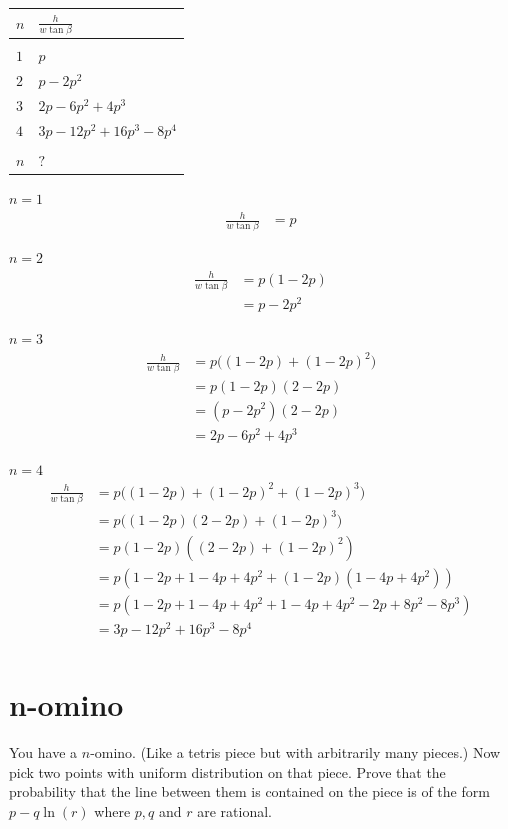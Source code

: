 \documentclass[12pt]{article}
\begin{document}
\newpage

\begin{tabular}{l|l}
  $n$&$\frac{h}{w\tan\beta}$\\
  \hline\\
  $1$& $p$\\
  $2$& $p - 2p^2$\\
  $3$& $2p - 6p^2 + 4p^3$\\
  $4$& $3p - 12p^2 + 16p^3 - 8p^4$\\ \\
  $n$& $?$
\end{tabular}


$n = 1$
\begin{align*}
  \frac{h}{w\tan\beta}
  &= p
\end{align*}

$n = 2$
\begin{align*}
  \frac{h}{w\tan\beta}
  &= p(1 - 2p)\\
        &= p - 2p^2
\end{align*}

$n = 3$
\begin{align*}
  \frac{h}{w\tan\beta}
  &= p\Big((1 - 2p) + (1 - 2p)^2\Big)\\
  &= p(1 - 2p)(2 - 2p)\\
  &= (p - 2p^2)(2 - 2p)\\
  &= 2p - 6p^2 + 4p^3
\end{align*}

$n = 4$
\begin{align*}
  \frac{h}{w\tan\beta}
  &= p\Big((1 - 2p) + (1 - 2p)^2 + (1 - 2p)^3\Big)\\
  &= p\Big((1 - 2p)(2 - 2p) + (1 - 2p)^3\Big)\\
  &= p(1 - 2p)((2 - 2p) + (1 - 2p)^2)\\
  &= p(1 - 2p + 1 - 4p + 4p^2 + (1 - 2p)(1 - 4p + 4p^2))\\
  &= p(1 - 2p + 1 - 4p + 4p^2 + 1 - 4p + 4p^2 - 2p + 8p^2 - 8p^3)\\
  &= 3p - 12p^2 + 16p^3 - 8p^4\\
\end{align*}



\section{n-omino}
\begin{mdframed}
  You have a $n$-omino. (Like a tetris piece but with arbitrarily many pieces.)
  Now pick two points with uniform distribution on that piece. Prove that the
  probability that the line between them is contained on the piece is of the
  form $p - q\ln(r)$ where $p,q$ and $r$ are rational.
\end{mdframed}
~\\
\end{document}
